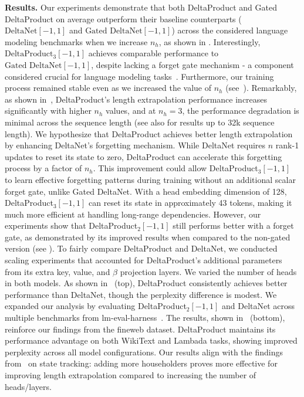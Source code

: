 \documentclass{article} %
\begin{document}
\textbf{Results.} 
Our experiments demonstrate that both DeltaProduct and Gated DeltaProduct on average outperform their baseline counterparts ($\text{DeltaNet}[-1,1]$ and $\text{Gated DeltaNet}[-1,1]$) across the considered language modeling benchmarks when we increase $n_h$, as shown in .
Interestingly, $\text{DeltaProduct}_{3}[-1,1]$ achieves comparable performance to $\text{Gated DeltaNet}[-1,1]$, despite lacking a forget gate mechanism - a component considered crucial for language modeling tasks~\citep{hochreiter1997long,gu2023mamba}.
Furthermore, our training process remained stable even as we increased the value of $n_h$ (see~).
Remarkably, as shown in~, DeltaProduct's length extrapolation performance increases significantly with higher $n_h$ values, and at $n_h=3$, the performance degradation is minimal across the sequence length (see also  for results up to 32k sequence length). We hypothesize that DeltaProduct achieves better length extrapolation by enhancing DeltaNet's forgetting mechanism. While DeltaNet requires $n$ rank-1 updates to reset its state to zero, DeltaProduct can accelerate this forgetting process by a factor of $n_h$. This improvement could allow DeltaProduct$_3[-1,1]$ to learn effective forgetting patterns during training without an additional scalar forget gate, unlike Gated DeltaNet.
With a head embedding dimension of 128, DeltaProduct$_3[-1,1]$ can reset its state in approximately 43 tokens, making it much more efficient at handling long-range dependencies. However, our experiments show that DeltaProduct$_2[-1,1]$ still performs better with a forget gate, as demonstrated by its improved results when compared to the non-gated version (see ). 
To fairly compare DeltaProduct and DeltaNet, we conducted scaling experiments that accounted for DeltaProduct's additional parameters from its extra key, value, and $\beta$ projection layers. We varied the number of heads in both models. As shown in~ (top), DeltaProduct consistently achieves better performance than DeltaNet, though the perplexity difference is modest.
We expanded our analysis by evaluating DeltaProduct$_2[-1,1]$ and DeltaNet across multiple benchmarks from lm-eval-harness~\citep{eval-harness}. 
The results, shown in~ (bottom), reinforce our findings from the fineweb dataset. DeltaProduct maintains its performance advantage on both WikiText and Lambada tasks, showing improved perplexity across all model configurations. 
Our results align with the findings from~ on state tracking: adding more householders proves more effective for improving length extrapolation compared to increasing the number of heads/layers.
\end{document}
